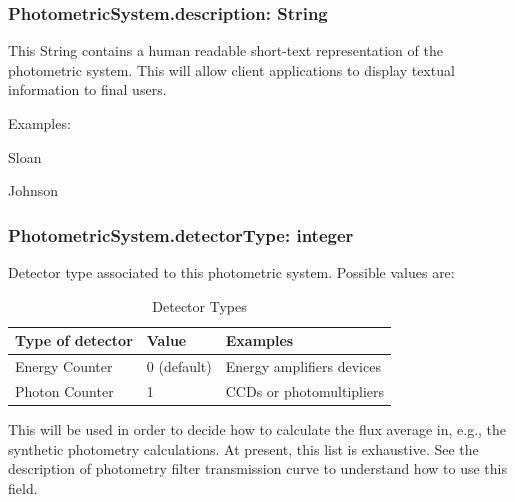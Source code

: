 \documentclass[11pt,a4paper]{ivoa}
\begin{document}
\subsubsection{PhotometricSystem.description: String}
This String contains a human readable short-text representation of the
photometric system. This will allow client applications to display
textual information to final users.
\par

Examples:


Sloan \par
Johnson
\bigskip



\subsubsection{PhotometricSystem.detectorType: integer}
Detector type associated to this photometric system. Possible
values are:




\begin{table}[ht]
 			\centering
\begin{tabular}{p{2.42in}p{0.8in}p{1.55in}}
\hline
\multicolumn{1}{|p{2.42in}}{Type of detector} &
\multicolumn{1}{|p{0.8in}}{Value} &
\multicolumn{1}{|p{1.55in}|}{Examples} \\
\hline
\multicolumn{1}{|p{2.42in}}{Energy Counter} &
\multicolumn{1}{|p{0.8in}}{0 (default)} &
\multicolumn{1}{|p{1.55in}|}{Energy amplifiers devices} \\
\hline
\multicolumn{1}{|p{2.42in}}{Photon Counter} &
\multicolumn{1}{|p{0.8in}}{1} &
\multicolumn{1}{|p{1.55in}|}{CCDs or photomultipliers} \\
\hline
\end{tabular}
\caption{Detector Types}
 \end{table}



This will be used in order to decide how to calculate the
flux average in, e.g., the synthetic photometry calculations.
At present, this list is exhaustive.
See the description of photometry filter
transmission curve to understand how to use this field.
\par
\end{document}
